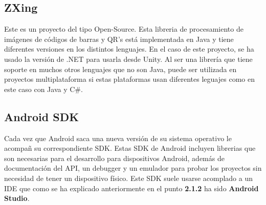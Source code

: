 \subsection{ZXing}
\label{cap2:subsec:zxing}

Este es un proyecto del tipo Open-Source. Esta libreria de procesamiento de im\'agenes de c\'odigos de barras y QR's est\'a implementada en Java y tiene diferentes versiones en los distintos lenguajes. En el caso de este proyecto, se ha usado la versi\'on de .NET para usarla desde Unity. Al ser una librer\'ia que tiene soporte en muchos otros lenguajes que no son Java, puede ser utilizada en proyectos multiplataforma si estas plataformas usan diferentes leguajes como en este caso con Java y C\#.


\subsection{Android SDK}
\label{cap2:subsec:android}

Cada vez que Android saca una nueva versi\'on de su sistema operativo le acompa\~n su correspondiente SDK. Estas SDK de Android incluyen librerias que son necesarias para el desarrollo para dispositivos Android, adem\'as de documentaci\'on del API, un debugger y un emulador para probar los proyectos sin necesidad de tener un dispositivo f\'isico. Este SDK suele usarse acomplado a un IDE que como se ha explicado anteriormente en el punto \textbf{2.1.2} ha sido \textbf{Android Studio}.




